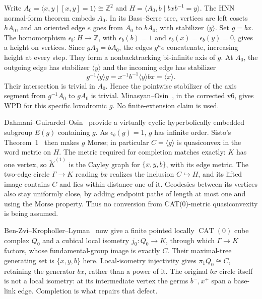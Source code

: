 \documentclass[11pt]{article}
\newcommand{\CAT}{\operatorname{CAT}}
\begin{document}
Write $A_0=\langle x,y\mid[x,y]=1\rangle\cong\mathbb Z^2$ and
$H=\langle A_0,b\mid bxb^{-1}=y\rangle$. The HNN normal-form theorem
embeds $A_0$. In its Bass--Serre tree, vertices are left cosets $hA_0$,
and an oriented edge $e$ goes from $A_0$ to $bA_0$, with stabilizer
$\langle y\rangle$. Set $g=bx$. The homomorphism
$\epsilon_b:H\to\mathbb Z$, with $\epsilon_b(b)=1$ and
$\epsilon_b(x)=\epsilon_b(y)=0$, gives a height on vertices. Since
$gA_0=bA_0$, the edges $g^ne$ concatenate, increasing height at every
step. They form a nonbacktracking bi-infinite axis of $g$.
At $A_0$, the outgoing edge has stabilizer $\langle y\rangle$ and the
incoming edge has stabilizer
\[
 g^{-1}\langle y\rangle g
 =x^{-1}b^{-1}\langle y\rangle bx=\langle x\rangle.
\]
Their intersection is trivial in $A_0$. Hence the pointwise stabilizer
of the axis segment from $g^{-1}A_0$ to $gA_0$ is trivial.
Minasyan--Osin~\cite[Corollary~4.3]{MO}, in the corrected v6, gives WPD
for this specific loxodromic $g$. No finite-extension claim is used.

Dahmani--Guirardel--Osin~\cite[Theorem~6.8 and Corollary~2.9]{DGO}
provide a virtually cyclic hyperbolically embedded subgroup $E(g)$
containing $g$. As $\epsilon_b(g)=1$, $g$ has infinite order. Sisto's
Theorem~1~\cite{Sisto} then makes $g$ Morse; in particular
$C=\langle g\rangle$ is quasiconvex in the word metric on $H$.
The metric required for completion matches exactly: $K$ has one vertex,
so $\widetilde K^{(1)}$ is the Cayley graph for $\{x,y,b\}$, with its
edge metric. The two-edge circle $\Gamma\to K$ reading $bx$ realizes
the inclusion $C\hookrightarrow H$, and its lifted image contains $C$
and lies within distance one of it. Geodesics between its vertices also
stay uniformly close, by adding endpoint paths of length at most one
and using the Morse property. Thus no conversion from CAT(0)-metric
quasiconvexity is being assumed.

Ben-Zvi--Kropholler--Lyman~\cite[Theorems~1.1 and 5.1]{BKL} now give a
finite pointed locally $\CAT(0)$ cube complex $Q_0$ and a cubical local
isometry $j_0:Q_0\to K$, through which $\Gamma\to K$ factors, whose
fundamental-group image is exactly $C$. Their maximal-tree generating
set is $\{x,y,b\}$ here. Local-isometry injectivity gives
$\pi_1Q_0\cong C$, retaining the generator $bx$, rather than a power of
it. The original $bx$ circle itself is not a local isometry: at its
intermediate vertex the germs $b^-,x^+$ span a base-link edge. Completion
is what repairs that defect.
\end{document}
